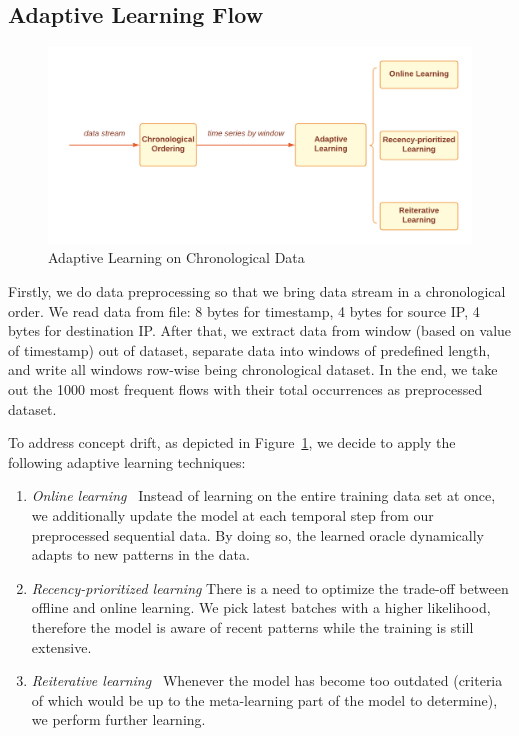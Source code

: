 \subsection{Adaptive Learning Flow}


\begin{figure}[htbp!]
\centering
\includegraphics[width=\textwidth]{images/workflow/adaptive learning.png}
\caption{Adaptive Learning on Chronological Data }
\label{fig:adaptive_flow}
\end{figure}

Firstly, we do data preprocessing so that we bring data stream in a chronological order. We read data from file: 8 bytes for timestamp, 4 bytes for source IP, 4 bytes for destination IP. After that, we extract data from window (based on value of timestamp) out of dataset, separate data into windows of predefined length, and write all windows row-wise being chronological dataset. In the end, we take out the 1000 most frequent flows with their total occurrences as preprocessed dataset.

To address concept drift, as depicted in Figure~\ref{fig:adaptive_flow}, we decide to apply the following adaptive learning techniques:

\begin{enumerate}
    \item \emph{Online learning~\cite{lee2020clinical}} Instead of learning on the entire training data set at once, we additionally update the model at each temporal step from our preprocessed sequential data. By doing so, the learned oracle dynamically adapts to new patterns in the data.
    
    \item \emph{Recency-prioritized learning} There is a need to optimize the trade-off between offline and online learning. We pick latest batches with a higher likelihood, therefore the model is aware of recent patterns while the training is still extensive.

    
    \item \emph{Reiterative learning~\cite{liang2018weakly}} Whenever the model has become too outdated (criteria of which would be up to the meta-learning part of the model to determine), we perform further learning.

\end{enumerate}

